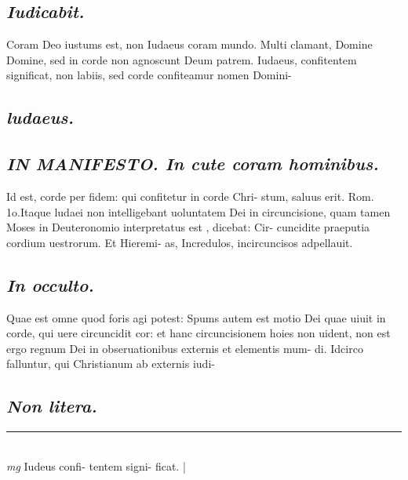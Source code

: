 \documentclass{article}
\begin{document}
\begin{pages}
\subsection*{\textit{Iudicabit. }}\pstart Coram Deo iustums est, non Iudaeus coram mundo.  Multi clamant, Domine Domine, sed in corde non agnoscunt Deum patrem. Iudaeus, confitentem significat, non labiis, sed corde confiteamur nomen Domini-  \pend
{}
{}
\subsection*{\textit{ludaeus. }}
{}
\subsection*{\textit{IN MANIFESTO. In cute coram hominibus.  }}\pstart Id est, corde per fidem: qui confitetur in corde Chri- stum, saluus erit. Rom. 1o.Itaque ludaei non intelligebant uoluntatem Dei in circuncisione, quam tamen Moses in Deuteronomio interpretatus est , dicebat: Cir- cuncidite praeputia cordium uestrorum. Et Hieremi- as, Incredulos, incircuncisos adpellauit.   \pend
{}
{}
\subsection*{\textit{In occulto. }}\pstart Quae est omne quod foris agi potest: Spums autem est motio Dei quae uiuit in corde, qui uere circuncidit cor: et hanc circuncisionem hoies non uident, non est ergo regnum Dei in obseruationibus externis et elementis mum- di. Idcirco falluntur, qui Christianum ab externis iudi-  \pend
{}
{}
\subsection*{\textit{Non litera. }}
\vspace{0.5cm}\noindent
\vspace{0.2cm}\rule{1cm}{0.2pt}\\ 
\hspace{0.2cm}\textit{mg}
\footnotesize Iudeus confi- tentem signi- ficat.  
\normalsize| 

\end{pages}
\end{document}
